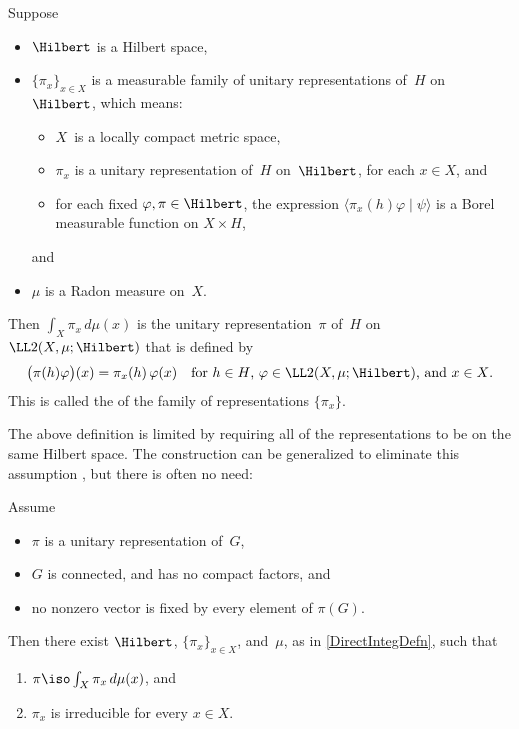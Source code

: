 \begin{defn} \label{DirectIntegDefn}
Suppose 
	\begin{itemize}
	\item $\Hilbert$ is a Hilbert space,
	\item $\{\pi_x\}_{x \in X}$ is a measurable family of unitary representations of~$H$ on~$\Hilbert$, which means:
		\begin{itemize}
		\item $X$~is a locally compact metric space,
		\item $\pi_x$ is a unitary representation of~$H$ on~$\Hilbert$, for each $x \in X$,
		and
		\item for each fixed $\varphi,\pi \in \Hilbert$, the expression $\langle \pi_x(h) \varphi \mid \psi \rangle$ is a Borel measurable function on $X \times H$,
		\end{itemize}
	and
	\item $\mu$ is a Radon measure on~$X$.
	\end{itemize}
Then $\int_X \pi_x \, d\mu(x)$ is the unitary representation~$\pi$ of~$H$ on $\LL2(X, \mu ; \Hilbert)$ that is defined by
	$$ \bigl( \pi(h) \varphi  \bigr)(x) = \pi_x(h) \, \varphi(x)
	 \quad \text{for $h \in H$, $\varphi \in \LL2(X, \mu ; \Hilbert)$, and $x \in X$} .$$
This is called the  of the family of representations $\{\pi_x\}$.
\end{defn}

The above definition is limited by requiring all of the representations to be on the same Hilbert space. The construction can be generalized to eliminate this assumption , but there is often no need: 

\begin{thm} \label{UnitaryGDirectInt}
Assume 	
	\begin{itemize}
	\item $\pi$ is a unitary representation of~$G$, 
	\item $G$ is connected, and has no compact factors,
	and
	\item no nonzero vector is fixed by every element of $\pi(G)$.
	\end{itemize}
Then there exist $\Hilbert$, $\{\pi_x\}_{x \in X}$, and~$\mu$, as in \cref{DirectIntegDefn}, such that 
	\begin{enumerate}
	\item $\pi \iso \int_X \pi_x \, d\mu(x)$, 
	and
	\item $\pi_x$ is irreducible for every $x \in X$.
	\end{enumerate}
\end{thm}



